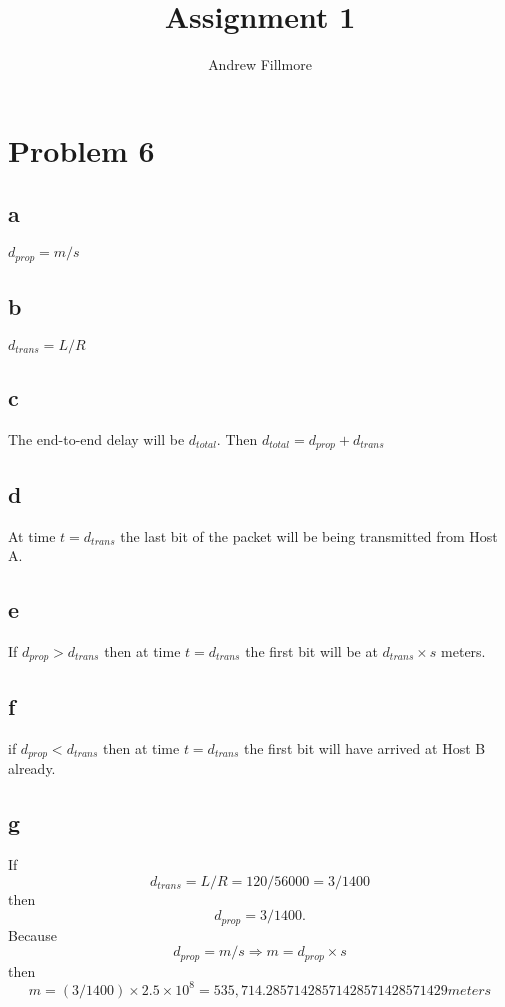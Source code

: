 \documentclass[12pt,letterpaper]{article}
\author{Andrew Fillmore}
\title{Assignment 1}
\begin{document}
\maketitle
\section*{Problem 6}
\subsection*{a}
$d_{prop}=m/s$
\subsection*{b}
$d_{trans}=L/R$
\subsection*{c}
The end-to-end delay will be $d_{total}$.
Then $d_{total}=d_{prop}+d_{trans}$
\subsection*{d}
At time $t=d_{trans}$ the last bit of the packet will be being transmitted from Host A.
\subsection*{e}
If $d_{prop}>d_{trans}$ then at time $t=d_{trans}$ the first bit will be at $d_{trans}\times s$ meters.
\subsection*{f}
if $d_{prop}<d_{trans}$ then at time $t=d_{trans}$ the first bit will have arrived at Host B already.
\subsection*{g}
If
$$d_{trans}=L/R=120/56000=3/1400$$
then
$$d_{prop}=3/1400.$$
Because
$$d_{prop}=m/s\Rightarrow m=d_{prop}\times s$$
then
$$m=(3/1400)\times2.5\times10^{8}=535,714.28571428571428571428571429meters$$
\end{document}

